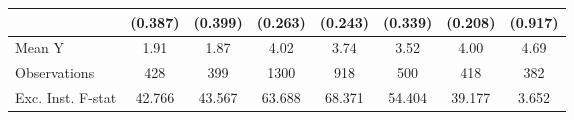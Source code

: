 {\begin{tabular}{l*{7}{c}}
            &     (0.387)         &     (0.399)         &     (0.263)         &     (0.243)         &     (0.339)         &     (0.208)         &     (0.917)         \\
\midrule
Mean Y      &        1.91         &        1.87         &        4.02         &        3.74         &        3.52         &        4.00         &        4.69         \\
Observations&         428         &         399         &        1300         &         918         &         500         &         418         &         382         \\
Exc. Inst. F-stat&      42.766         &      43.567         &      63.688         &      68.371         &      54.404         &      39.177         &       3.652         \\
\bottomrule
\end{tabular}
}
